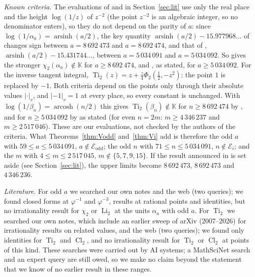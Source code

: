\documentclass[11pt]{amsart}
\theoremstyle{definition}
\theoremstyle{remark}
\numberwithin{equation}{section}
\newcommand{\KK}{\mathbb{K}}
\newcommand{\cE}{\mathcal{E}}
\newcommand{\Li}{\operatorname{Li}}
\newcommand{\Ti}{\operatorname{Ti}}
\newcommand{\Cl}{\operatorname{Cl}}
\begin{document}
\emph{Known criteria.} The evaluations of \cite[Thm.~1]{DHK2022b} and \cite[Thm.~2.1]{DHK2020} in
Section~\ref{sec:lit} use only the real place and the height $\log(1/z)$ of $z^{-2}$ (the point $z^{-2}$ is an algebraic integer, so no
denominator enters), so they do not depend on the parity of $a$: since
$\log(1/\alpha_a)=\operatorname{arsinh}(a/2)$, the key quantity $\operatorname{arsinh}(a/2)-15.977968\ldots$ of
\cite{DHK2022b} changes sign between $a=8\,692\,473$ and $a=8\,692\,474$, and that of \cite{DHK2020},
$\operatorname{arsinh}(a/2)-15.431744\ldots$, between $a=5\,034\,091$ and $a=5\,034\,092$. So \cite{DHK2022b} gives the
stronger $\chi_2(\alpha_a)\notin\KK$ for $a\ge8\,692\,474$, and \cite{DHK2020}, as stated, for $a\ge5\,034\,092$. For the
inverse tangent integral, $\Ti_2(z)=z+\frac z4\Phi_2(\frac12,-z^2)$: the point $1$ is replaced by $-1$. Both criteria
depend on the points only through their absolute values $|\cdot|_v$, and $|-1|_v=1$ at every place, so every constant
is unchanged. With $\log(1/\beta_n)=\operatorname{arcosh}(n/2)$ this gives $\Ti_2(\beta_n)\notin\KK$ for
$n\ge8\,692\,474$ by \cite{DHK2022b}, and for $n\ge5\,034\,092$ by \cite{DHK2020} as stated (for even $n=2m$:
$m\ge4\,346\,237$ and $m\ge2\,517\,046$). These are our evaluations, not checked by the authors of the criteria. What
Theorems~\ref{thm:Vodd} and~\ref{thm:Vi} add is therefore the odd $a$ with $59\le a\le5\,034\,091$,
$a\notin\cE_{\mathrm{odd}}$; the odd $n$ with $71\le n\le5\,034\,091$, $n\notin\cE_i$; and the $m$ with
$4\le m\le2\,517\,045$, $m\notin\{5,7,9,15\}$. If the result announced in \cite{DHK2020} is set aside (see
Section~\ref{sec:lit}), the upper limits become $8\,692\,473$, $8\,692\,473$ and $4\,346\,236$.

\emph{Literature.} For odd $a$ we searched our own notes and the web (two queries); we found closed forms at
$\varphi^{-1}$ and $\varphi^{-3}$, results at rational points and identities, but no irrationality result for $\chi_2$ or
$\Li_2$ at the units $\alpha_a$ with odd $a$. For $\Ti_2$ we searched our own notes, which include an earlier sweep of
arXiv (2007--2026) for irrationality results on related values, and the web (two queries); we found only identities for
$\Ti_2$ and $\Cl_2$, and no irrationality result for $\Ti_2$ or $\Cl_2$ at points of this kind. These searches were
carried out by AI systems; a MathSciNet search and an expert query are still owed, so we make no claim beyond the
statement that we know of no earlier result in these ranges.

\end{document}
